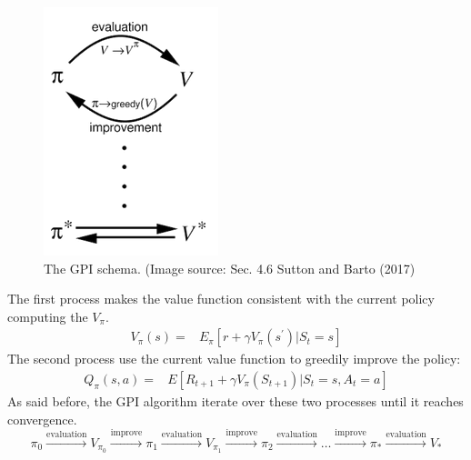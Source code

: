 \begin{figure}[h]
\centering
\includegraphics[width=.75\textwidth, height=.4 \textheight]{pictures/gpi_schema}
\caption{The GPI schema. (Image source: Sec. 4.6 Sutton and Barto (2017) \cite{bib:2018Sutton_RLBook}}
\end{figure}

The first process makes the value function consistent with the current policy computing the $V_\pi$.
\begin{align*}
V_{\pi}(s) =& E_\pi \left[  r + \gamma V_\pi(s^{'}) | S_t = s \right]
\end{align*}
The second process use the current value function to greedily  improve the policy:
\begin{align*}
Q_\pi(s,a) =& E\left[ R_{t+1} + \gamma V_\pi(S_{t+1}) | S_t = s, A_t = a \right]
\end{align*}
As said before, the GPI algorithm iterate over these two processes until it reaches convergence.
\begin{equation*}
\pi_0 \xrightarrow[]{\text{evaluation}} V_{\pi_0} \xrightarrow[]{\text{improve}}
\pi_1 \xrightarrow[]{\text{evaluation}} V_{\pi_1} \xrightarrow[]{\text{improve}}
\pi_2 \xrightarrow[]{\text{evaluation}} \dots \xrightarrow[]{\text{improve}}
\pi_* \xrightarrow[]{\text{evaluation}} V_*
\end{equation*}
